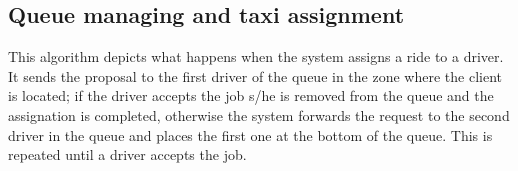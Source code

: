 \documentclass[a4paper,11pt]{report} %
\begin{document}
	\subsection{Queue managing and taxi assignment}
	This algorithm depicts what happens when the system assigns a ride to a driver. It sends the proposal to the first driver of the queue in the zone where the client is located; if the driver accepts the job s/he is removed from the queue and the assignation is completed, otherwise the system forwards the request to the second driver in the queue and places the first one at the bottom of the queue. This is repeated until a driver accepts the job. \\
	
	\begin{minipage}{\linewidth}

\end{minipage}
\end{document}
